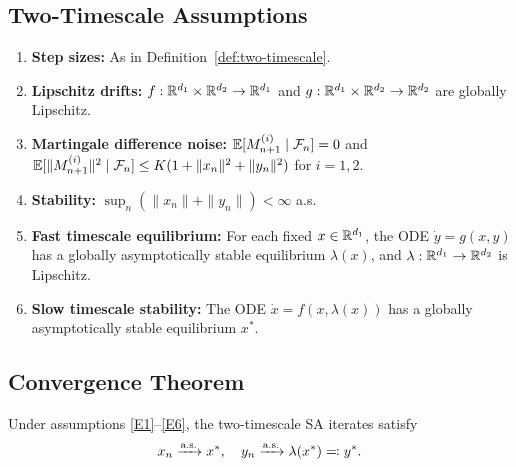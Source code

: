 \documentclass[11pt,a4paper]{article}
\begin{document}
\subsection{Two-Timescale Assumptions}

\begin{definition}
\label{def:two-ts-assumptions}
\begin{enumerate}[label=(E\arabic*)]
  \item \label{E1} \textbf{Step sizes:} As in
    Definition~\ref{def:two-timescale}.
  \item \label{E2} \textbf{Lipschitz drifts:}
    $f : \mathbb{R}^{d_1} \times \mathbb{R}^{d_2} \to \mathbb{R}^{d_1}$ and
    $g : \mathbb{R}^{d_1} \times \mathbb{R}^{d_2} \to \mathbb{R}^{d_2}$ are globally
    Lipschitz.
  \item \label{E3} \textbf{Martingale difference noise:}
    $\mathbb{E}[M_{n+1}^{(i)} \mid \mathcal{F}_n] = 0$ and
    $\mathbb{E}[\|M_{n+1}^{(i)}\|^2 \mid \mathcal{F}_n] \leq
    K(1 + \|x_n\|^2 + \|y_n\|^2)$ for $i = 1,2$.
  \item \label{E4} \textbf{Stability:}
    $\sup_n(\|x_n\| + \|y_n\|) < \infty$ a.s.
  \item \label{E5} \textbf{Fast timescale equilibrium:} For each
    fixed $x \in \mathbb{R}^{d_1}$, the ODE $\dot{y} = g(x,y)$ has a
    globally asymptotically stable equilibrium $\lambda(x)$, and
    $\lambda : \mathbb{R}^{d_1} \to \mathbb{R}^{d_2}$ is Lipschitz.
  \item \label{E6} \textbf{Slow timescale stability:} The ODE
    $\dot{x} = f(x, \lambda(x))$ has a globally asymptotically
    stable equilibrium $x^*$.
\end{enumerate}
\end{definition}

\subsection{Convergence Theorem}

\begin{theorem}
\label{thm:two-timescale}
Under assumptions \ref{E1}--\ref{E6}, the two-timescale SA iterates
satisfy
\[
  x_n \xrightarrow{\text{a.s.}} x^*, \quad y_n \xrightarrow{\text{a.s.}} \lambda(x^*) \eqqcolon y^*.
\]
\end{theorem}
\end{document}
